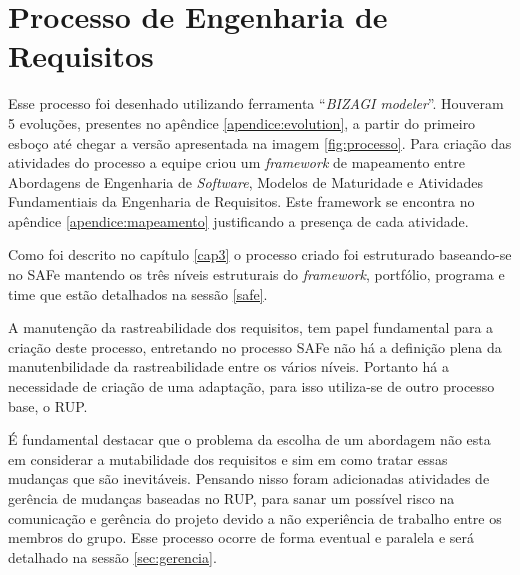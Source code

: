 \chapter[Processo de Engenharia de Requisitos]{Processo de Engenharia de Requisitos}\label{cap4}

Esse processo foi desenhado utilizando ferramenta ``\textit{BIZAGI modeler}''. Houveram 5 evoluções,
presentes no apêndice \ref{apendice:evolution}, a partir do primeiro esboço até chegar a versão apresentada na imagem \ref{fig:processo}. Para criação das atividades do processo
a equipe criou um \textit{framework} de mapeamento entre Abordagens de Engenharia de \textit{Software}, Modelos de Maturidade e Atividades Fundamentiais da Engenharia de Requisitos. Este framework se encontra
no apêndice \ref{apendice:mapeamento} justificando a presença de cada atividade.

Como foi descrito no capítulo \ref{cap3} o processo criado foi estruturado baseando-se no
SAFe mantendo os três níveis estruturais do \textit{framework}, portfólio, programa e time
que estão detalhados na sessão \ref{safe}.

A manutenção da rastreabilidade dos requisitos, tem papel fundamental para a criação deste processo,
entretando no processo SAFe não há a definição plena da manutenbilidade da rastreabilidade entre os
vários níveis. Portanto há a necessidade de criação de uma adaptação, para isso utiliza-se de
outro processo base, o RUP.

É fundamental destacar que o problema da escolha de um abordagem não esta em considerar
a mutabilidade dos requisitos e sim em como tratar essas mudanças que são inevitáveis.
Pensando nisso foram adicionadas atividades de gerência de mudanças baseadas no RUP,
para sanar um possível risco na comunicação e gerência do projeto devido a não experiência
de trabalho entre os membros do grupo. Esse processo ocorre de forma eventual e paralela
e será detalhado na sessão \ref{sec:gerencia}.


